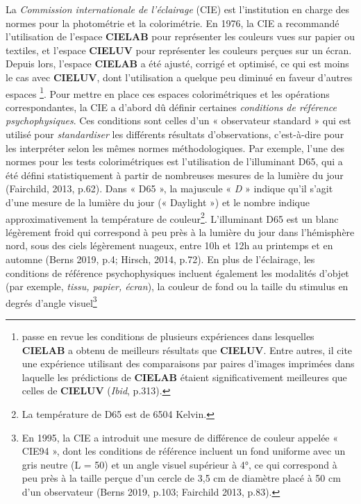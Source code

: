 \documentclass{article}
\begin{document}
La \textit{Commission internationale de l'éclairage} (CIE) est l'institution en charge des normes pour la photométrie et la colorimétrie. En 1976, la CIE a recommandé l'utilisation de l'espace \textbf{CIELAB} pour représenter les couleurs vues sur papier ou textiles, et l'espace \textbf{CIELUV} pour représenter les couleurs perçues sur un écran. Depuis lors, l'espace \textbf{CIELAB} a été ajusté, corrigé et optimisé, ce qui est moins le cas avec \textbf{CIELUV}, dont l'utilisation a quelque peu diminué en faveur d'autres espaces
\footnote{\textcite[pp.313-316]{fairchild2013}  passe en revue les conditions de plusieurs expériences dans lesquelles \textbf{CIELAB} a obtenu de meilleurs résultats que \textbf{CIELUV}. Entre autres, il cite une expérience utilisant des comparaisons par paires d'images imprimées dans laquelle les prédictions de \textbf{CIELAB} étaient significativement meilleures que celles de \textbf{CIELUV} (\textit{Ibid}, p.313).}. Pour mettre en place ces espaces colorimétriques et les opérations correspondantes, la CIE a d'abord dû définir certaines \textit{conditions de référence psychophysiques}. Ces conditions sont celles d'un « observateur standard » qui est utilisé pour \textit{standardiser} les différents résultats d'observations, c'est-à-dire pour les interpréter selon les mêmes normes méthodologiques. Par exemple, l'une des normes pour les tests colorimétriques est l'utilisation de l'illuminant D65, qui a été défini statistiquement à partir de nombreuses mesures de la lumière du jour (Fairchild, 2013, p.62). Dans « D65 », la majuscule « \textit{D} » indique qu'il s'agit d'une mesure de la lumière du jour (« Daylight ») et le nombre indique approximativement la température de couleur\footnote{La température de D65 est de 6504 Kelvin.}. L'illuminant D65 est un blanc légèrement froid qui correspond à peu près à la lumière du jour dans l'hémisphère nord, sous des ciels légèrement nuageux, entre 10h et 12h au printemps et en automne (Berns 2019, p.4; Hirsch, 2014, p.72). En plus de l'éclairage, les conditions de référence psychophysiques incluent également les modalités d'objet (par exemple, \textit{tissu, papier, écran}), la couleur de fond ou la taille du stimulus en degrés d'angle visuel\footnote{En 1995, la CIE a introduit une mesure de différence de couleur appelée « CIE94 », dont les conditions de référence incluent un fond uniforme avec un gris neutre (L = 50) et un angle visuel supérieur à 4°, ce qui correspond à peu près à la taille perçue d'un cercle de 3,5 cm de diamètre placé à 50 cm d'un observateur (Berns 2019, p.103; Fairchild 2013, p.83).}
\end{document}
